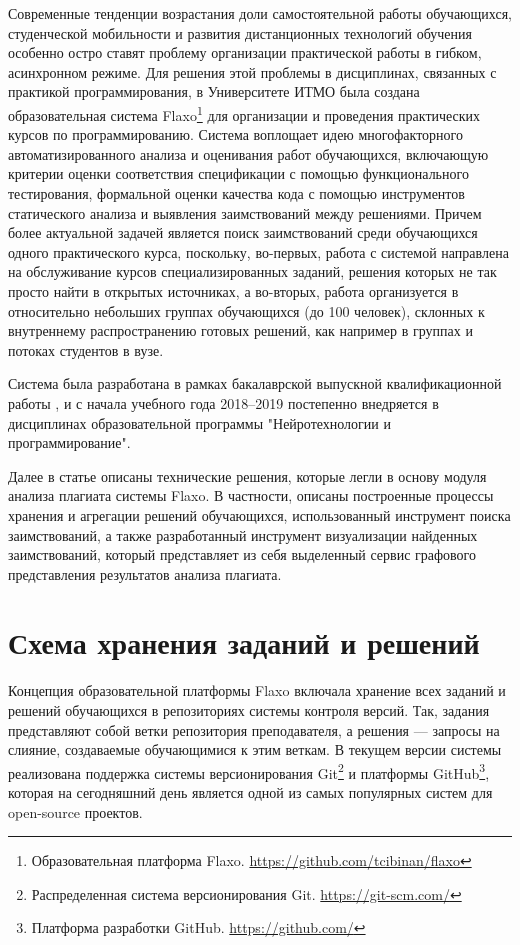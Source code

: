 \documentclass[a4paper,14pt]{extarticle}
\begin{document}
Современные тенденции возрастания доли самостоятельной работы обучающихся, студенческой мобильности и развития дистанционных технологий обучения особенно остро ставят проблему организации практической работы в гибком, асинхронном режиме. Для решения этой проблемы в дисциплинах, связанных с практикой программирования, в Университете ИТМО была создана образовательная система Flaxo\footnote{Образовательная платформа Flaxo. \url{https://github.com/tcibinan/flaxo}} для организации и проведения практических курсов по программированию. Система воплощает идею многофакторного автоматизированного анализа и оценивания работ обучающихся, включающую критерии оценки соответствия спецификации с помощью функционального тестирования, формальной оценки качества кода с помощью инструментов статического анализа и выявления заимствований между решениями. Причем более актуальной задачей является поиск заимствований среди обучающихся одного практического курса, поскольку, во-первых, работа с системой направлена на обслуживание курсов специализированных заданий, решения которых не так просто найти в открытых источниках, а во-вторых, работа организуется в относительно небольших группах обучающихся (до 100 человек), склонных к внутреннему распространению готовых решений, как например в группах и потоках студентов в вузе.

Система была разработана в рамках бакалаврской выпускной квалификационной работы \citep{flaxoThesis}\citep{flaxoKmu}, и с начала учебного года 2018--2019 постепенно внедряется в дисциплинах образовательной программы "Нейротехнологии и программирование".

Далее в статье описаны технические решения, которые легли в основу модуля анализа плагиата системы Flaxo. В частности, описаны построенные процессы хранения и агрегации решений обучающихся, использованный инструмент поиска заимствований, а также разработанный инструмент визуализации найденных заимствований, который представляет из себя выделенный сервис графового представления результатов анализа плагиата.

\section{Схема хранения заданий и решений}

Концепция образовательной платформы Flaxo включала хранение всех заданий и решений обучающихся в репозиториях системы контроля версий. Так, задания представляют собой ветки репозитория преподавателя, а решения --- запросы на слияние, создаваемые обучающимися к этим веткам. В текущем версии системы реализована поддержка системы версионирования Git\footnote{Распределенная система версионирования Git. \url{https://git-scm.com/}} и платформы GitHub\footnote{Платформа разработки GitHub. \url{https://github.com/}}, которая на сегодняшний день является одной из самых популярных систем для open-source проектов.
\end{document}
